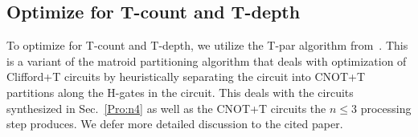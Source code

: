 \subsection{Optimize for T-count and T-depth}
\label{Pro:Tpar}

To optimize for T-count and T-depth, we utilize the T-par algorithm from~\cite{bib-amy-matroid}. This is a
variant of the matroid partitioning algorithm that deals with optimization of Clifford+T circuits by heuristically
separating the circuit into CNOT+T partitions along the H-gates in the circuit. This deals with the circuits
synthesized in Sec.~\ref{Pro:n4} as well as the CNOT+T circuits the $n \leq 3$ processing step produces. We defer
more detailed discussion to the cited paper.



